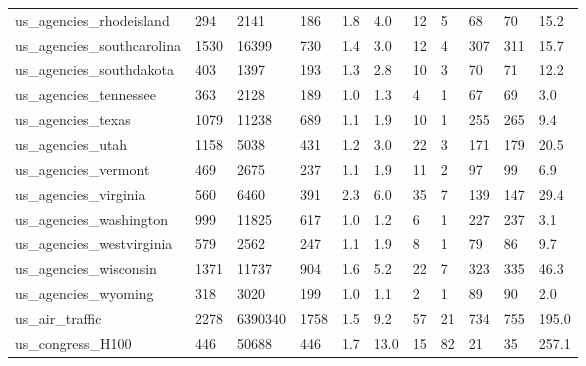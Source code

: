 \begin{longtable}{lllllllllll}
 us\_agencies\_rhodeisland                            & 294        & 2141      & 186   & 1.8    & 4.0    & 12    & 5      & 68     & 70     & 15.2    \\
 us\_agencies\_southcarolina                          & 1530       & 16399     & 730   & 1.4    & 3.0    & 12    & 4      & 307    & 311    & 15.7    \\
 us\_agencies\_southdakota                            & 403        & 1397      & 193   & 1.3    & 2.8    & 10    & 3      & 70     & 71     & 12.2    \\
 us\_agencies\_tennessee                              & 363        & 2128      & 189   & 1.0    & 1.3    & 4     & 1      & 67     & 69     & 3.0     \\
 us\_agencies\_texas                                  & 1079       & 11238     & 689   & 1.1    & 1.9    & 10    & 1      & 255    & 265    & 9.4     \\
 us\_agencies\_utah                                   & 1158       & 5038      & 431   & 1.2    & 3.0    & 22    & 3      & 171    & 179    & 20.5    \\
 us\_agencies\_vermont                                & 469        & 2675      & 237   & 1.1    & 1.9    & 11    & 2      & 97     & 99     & 6.9     \\
 us\_agencies\_virginia                               & 560        & 6460      & 391   & 2.3    & 6.0    & 35    & 7      & 139    & 147    & 29.4    \\
 us\_agencies\_washington                             & 999        & 11825     & 617   & 1.0    & 1.2    & 6     & 1      & 227    & 237    & 3.1     \\
 us\_agencies\_westvirginia                           & 579        & 2562      & 247   & 1.1    & 1.9    & 8     & 1      & 79     & 86     & 9.7     \\
 us\_agencies\_wisconsin                              & 1371       & 11737     & 904   & 1.6    & 5.2    & 22    & 7      & 323    & 335    & 46.3    \\
 us\_agencies\_wyoming                                & 318        & 3020      & 199   & 1.0    & 1.1    & 2     & 1      & 89     & 90     & 2.0     \\
 us\_air\_traffic                                     & 2278       & 6390340   & 1758  & 1.5    & 9.2    & 57    & 21     & 734    & 755    & 195.0   \\
 us\_congress\_H100                                   & 446        & 50688     & 446   & 1.7    & 13.0   & 15    & 82     & 21     & 35     & 257.1   \\

\end{longtable}
